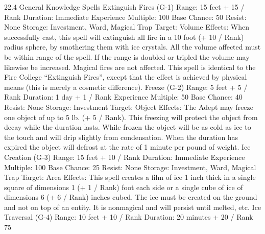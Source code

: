 \documentclass[a4paper]{article}
\begin{document}
\begin{multicols}{3}
22.4 General Knowledge Spells
Extinguish Fires (G-1)
Range: 15 feet + 15 / Rank
Duration: Immediate
Experience Multiple: 100
Base Chance: 50%
Resist: None
Storage: Investment, Ward, Magical Trap
Target: Volume
Effects: When successfully cast, this spell will
extinguish all fire in a 10 foot (+ 10 / Rank) radius
sphere, by smothering them with ice crystals. All
the volume affected must be within range of the
spell. If the range is doubled or tripled the volume
may likewise be increased. Magical fires are not
affected. This spell is identical to the Fire College
“Extinguish Fires”, except that the effect is
achieved by physical means (this is merely a cosmetic difference).
Freeze (G-2)
Range: 5 feet + 5 / Rank
Duration: 1 day + 1 / Rank
Experience Multiple: 50
Base Chance: 40%
Resist: None
Storage: Investment
Target: Object
Effects: The Adept may freeze one object of up to
5 lb. (+ 5 / Rank). This freezing will protect the
object from decay while the duration lasts. While
frozen the object will be as cold as ice to the touch
and will drip slightly from condensation. When the
duration has expired the object will defrost at the
rate of 1 minute per pound of weight.
Ice Creation (G-3)
Range: 15 feet + 10 / Rank
Duration: Immediate
Experience Multiple: 100
Base Chance: 25%
Resist: None
Storage: Investment, Ward, Magical Trap
Target: Area
Effects: This spell creates a film of ice 1 inch thick
in a single square of dimensions 1 (+ 1 / Rank) foot
each side or a single cube of ice of dimensions 6 (+
6 / Rank) inches cubed. The ice must be created on
the ground and not on top of an entity. It is nonmagical and will persist until melted, etc.
Ice Traversal (G-4)
Range: 10 feet + 10 / Rank
Duration: 20 minutes + 20 / Rank
75


\end{multicols}
\end{document}
